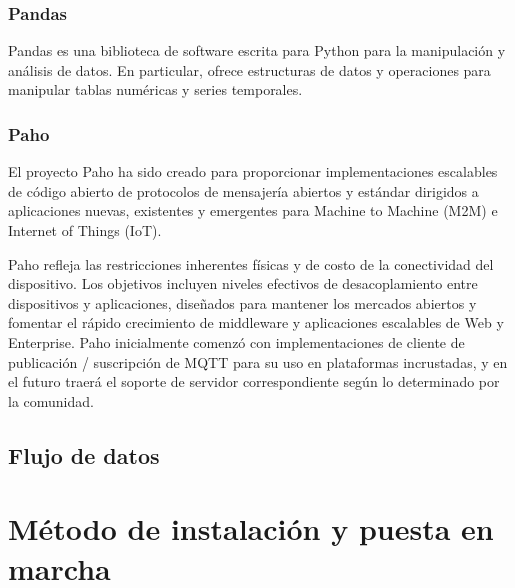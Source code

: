 		\subsubsection{Pandas}
		Pandas es una biblioteca de software escrita para Python para la manipulación y análisis de datos. En particular, ofrece estructuras de datos y operaciones para manipular tablas numéricas y series temporales.
		
		\subsubsection{Paho}
		El proyecto Paho ha sido creado para proporcionar implementaciones escalables de código abierto de protocolos de mensajería abiertos y estándar dirigidos a aplicaciones nuevas, existentes y emergentes para Machine to Machine (M2M) e Internet of Things (IoT).
		
		Paho refleja las restricciones inherentes físicas y de costo de la conectividad del dispositivo. Los objetivos incluyen niveles efectivos de desacoplamiento entre dispositivos y aplicaciones, diseñados para mantener los mercados abiertos y fomentar el rápido crecimiento de middleware y aplicaciones escalables de Web y Enterprise. Paho inicialmente comenzó con implementaciones de cliente de publicación / suscripción de MQTT para su uso en plataformas incrustadas, y en el futuro traerá el soporte de servidor correspondiente según lo determinado por la comunidad.
		
	\subsection{Flujo de datos}

\section{Método de instalación y puesta en marcha}
\label{makereference4.4}